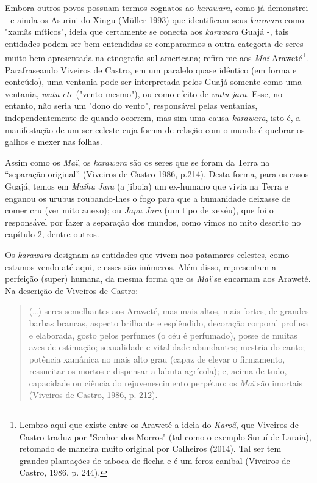 Embora outros povos possuam termos cognatos ao \emph{karawara}, como já
demonstrei - e ainda os Asurini do Xingu (Müller 1993) que identificam
seus \emph{karovara} como "xamãs míticos", ideia que certamente se
conecta aos \emph{karawara} Guajá -, tais entidades podem ser bem
entendidas se compararmos a outra categoria de seres muito bem
apresentada na etnografia sul-americana; refiro-me aos \emph{Maï}
Araweté\footnote{Lembro aqui que existe entre os Araweté a ideia do
  \emph{Karoã}, que Viveiros de Castro traduz por "Senhor dos Morros"
  (tal como o exemplo Suruí de Laraia), retomado de maneira muito
  original por Calheiros (2014). Tal ser tem grandes plantações de
  taboca de flecha e é um feroz canibal (Viveiros de Castro, 1986, p.
  244).}. Parafraseando Viveiros de Castro, em um paralelo quase
idêntico (em forma e conteúdo), uma ventania pode ser interpretada pelos
Guajá somente como uma ventania, \emph{wutu ete} ("vento mesmo"), ou
como efeito de \emph{wutu jara}. Esse, no entanto, não seria um "dono do
vento", responsável pelas ventanias, independentemente de quando
ocorrem, mas sim uma causa\emph{-karawara}, isto é, a manifestação de um
ser celeste cuja forma de relação com o mundo é quebrar os galhos e
mexer nas folhas.

Assim como os \emph{Maï}, os \emph{karawara} são os seres que se foram
da Terra na ``separação original'' (Viveiros de Castro 1986, p.214).
Desta forma, para os casos Guajá, temos em \emph{Maihu} \emph{Jara} (a
jiboia) um ex-humano que vivia na Terra e enganou os urubus
roubando-lhes o fogo para que a humanidade deixasse de comer cru (ver
mito anexo); ou \emph{Japu Jara} (um tipo de xexéu), que foi o
responsável por fazer a separação dos mundos, como vimos no mito
descrito no capítulo 2, dentre outros.

Os \emph{karawara} designam as entidades que vivem nos patamares
celestes, como estamos vendo até aqui, e esses são inúmeros. Além disso,
representam a perfeição (super) humana, da mesma forma que os \emph{Maï}
se encarnam aos Araweté. Na descrição de Viveiros de Castro:

\begin{quote}
(\ldots{}) seres semelhantes aos Araweté, mas mais altos, mais fortes, de
grandes barbas brancas, aspecto brilhante e esplêndido, decoração
corporal profusa e elaborada, gosto pelos perfumes (o céu é perfumado),
posse de muitas aves de estimação; sexualidade e vitalidade abundantes;
mestria do canto; potência xamânica no mais alto grau (capaz de elevar o
firmamento, ressucitar os mortos e dispensar a labuta agrícola); e,
acima de tudo, capacidade ou ciência do rejuvenescimento perpétuo: os
\emph{Maï} são imortais (Viveiros de Castro, 1986, p. 212).
\end{quote}

